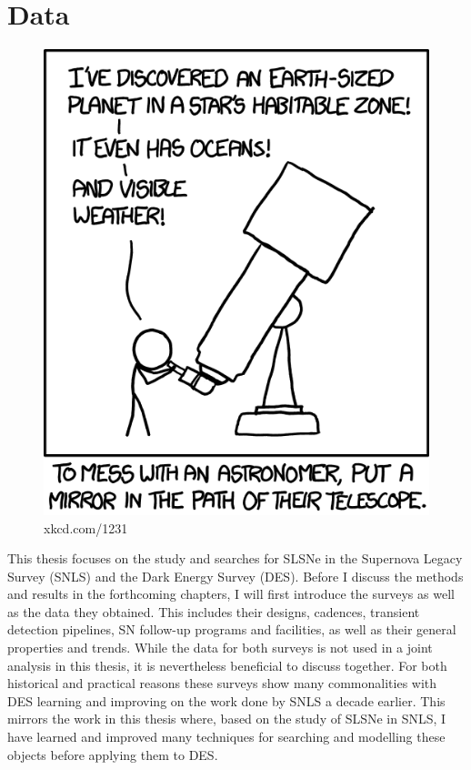 \chapter{Data}
\label{Chapter2}

\begin{figure}[H]
  \centering
  \includegraphics{Figures/xkcd/chapter2.png}
  \caption*{xkcd.com/1231}
\end{figure}

This thesis focuses on the study and searches for SLSNe in the Supernova Legacy Survey (SNLS) and the Dark Energy Survey (DES). Before I discuss the methods and results in the forthcoming chapters, I will first introduce the surveys as well as the data they obtained. This includes their designs, cadences, transient detection pipelines, SN follow-up programs and facilities, as well as their general properties and trends. While the data for both surveys is not used in a joint analysis in this thesis, it is nevertheless beneficial to discuss together. For both historical and practical reasons these surveys show many commonalities with DES learning and improving on the work done by SNLS a decade earlier. This mirrors the work in this thesis where, based on the study of SLSNe in SNLS, I have learned and improved many techniques for searching and modelling these objects before applying them to DES.

